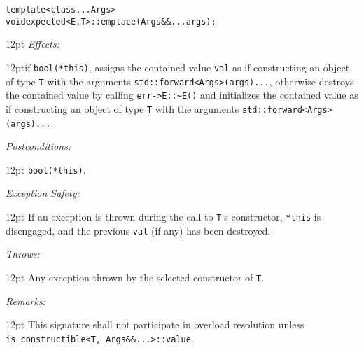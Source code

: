 \documentclass[a4paper,10pt]{article}
\newcommand{\cpp}[1]{\lstinline{#1}}
\newcommand{\wordingItem}[1]{\noindent\textit{#1:}}
\newenvironment{wordingTextItem}[1]{\wordingItem{#1}\vspace{2pt}\noindent\begin{adjustwidth}{12pt}{}}{\vspace{2pt}\end{adjustwidth}}
\newenvironment{wordingPara}{\begin{adjustwidth}{12pt}{}}{\end{adjustwidth}}
\newcommand{\suppress}[1]{\colorbox{suppress_color}{#1}}
\begin{document}
\begin{alltt}
template <class... Args>
void \suppress{expected<E,T>::}emplace(Args&&... args); 
\end{alltt}
\begin{wordingPara}
\begin{wordingTextItem}{Effects}if \cpp{bool(*this)}, assigns the contained value \cpp{val} as if constructing an object of type \cpp{T} with the arguments \cpp{std::forward<Args>(args)...}, otherwise destroys the contained value by calling \cpp{err->E::~E()} and  initializes the contained value as if constructing an object of type \cpp{T} with the arguments \cpp{std::forward<Args>(args)...}.
\end{wordingTextItem}
\begin{wordingTextItem}{Postconditions}
\cpp{bool(*this)}.
\end{wordingTextItem}
\begin{wordingTextItem}{Exception Safety}
If an exception is thrown during the call to \cpp{T}'s constructor, \cpp{*this} is disengaged, and the previous \cpp{val} (if any) has been destroyed.
\end{wordingTextItem}
\begin{wordingTextItem}{Throws}
Any exception thrown by the selected constructor of \cpp{T}.
\end{wordingTextItem}
\begin{wordingTextItem}{Remarks}
This signature shall not participate in overload resolution unless\\
\cpp{is_constructible<T, Args&&...>::value}.
\end{wordingTextItem}
\end{wordingPara}
\end{document}
